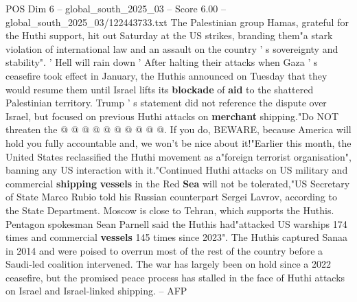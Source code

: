 \begin{textsample}{POS Dim 6 – global\_south\_2025\_03 – Score 6.00 – global\_south\_2025\_03/122443733.txt}
The Palestinian group Hamas, grateful for the Huthi support, hit out Saturday at the US strikes, branding them"a stark violation of international law and an assault on the country ' s sovereignty and stability". ' Hell will rain down ' After halting their attacks when Gaza ' s ceasefire took effect in January, the Huthis announced on Tuesday that they would resume them until Israel lifts its \textbf{blockade} of \textbf{aid} to the shattered Palestinian territory.
Trump ' s statement did not reference the dispute over Israel, but focused on previous Huthi attacks on \textbf{merchant} shipping."Do NOT threaten the @ @ @ @ @ @ @ @ @ @.
If you do, BEWARE, because America will hold you fully accountable and, we won't be nice about it!"Earlier this month, the United States reclassified the Huthi movement as a"foreign terrorist organisation", banning any US interaction with it."Continued Huthi attacks on US military and commercial \textbf{shipping} \textbf{vessels} in the Red \textbf{Sea} will not be tolerated,"US Secretary of State Marco Rubio told his Russian counterpart Sergei Lavrov, according to the State Department.
Moscow is close to Tehran, which supports the Huthis.
Pentagon spokesman Sean Parnell said the Huthis had"attacked US warships 174 times and commercial \textbf{vessels} 145 times since 2023".
The Huthis captured Sanaa in 2014 and were poised to overrun most of the rest of the country before a Saudi-led coalition intervened.
The war has largely been on hold since a 2022 ceasefire, but the promised peace process has stalled in the face of Huthi attacks on Israel and Israel-linked shipping. -- AFP

\end{textsample}
